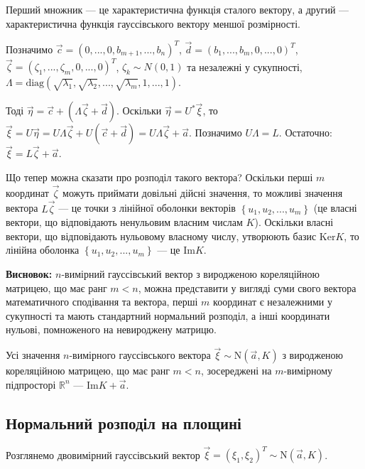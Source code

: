 Перший множник --- це характеристична функція сталого вектору, а другий --- характеристична функція гауссівського вектору меншої розмірності.

Позначимо $\vec{c} = (0, ..., 0, b_{m+1}, ..., b_{n})^T$,
$\vec{d} = (b_1, ..., b_m, 0, ..., 0)^T$,
$\vec{\zeta} = (\zeta_1, ..., \zeta_m, 0, ..., 0)^T$, $\zeta_k \sim {N}(0, 1)$ та незалежні у сукупності,
$\Lambda = \mathrm{diag}(\sqrt{\lambda_1}, \sqrt{\lambda_2}, ..., \sqrt{\lambda_m}, 1, ..., 1)$.

Тоді $\vec{\eta} = \vec{c} + \left(\Lambda \vec{\zeta} + \vec{d} \right)$. 
Оскільки $\vec{\eta} = U^{*}\vec{\xi}$, то $\vec{\xi} = U\vec{\eta} = U\Lambda \vec{\zeta} + U(\vec{c} + \vec{d}) = U\Lambda \vec{\zeta} + \vec{a}$.
Позначимо $U\Lambda = L$. Остаточно: $\vec{\xi} = L\vec{\zeta} + \vec{a}$.

Що тепер можна сказати про розподіл такого вектора? Оскільки перші $m$ координат $\vec{\zeta}$ можуть приймати довільні дійсні значення, то
можливі значення вектора $L\vec{\zeta}$ --- це точки з лінійної оболонки векторів $\left\{u_1, u_2, ..., u_m\right\}$ (це власні вектори, що відповідають ненульовим власним числам $K$).
Оскільки власні вектори, що відповідають нульовому власному числу, утворюють базис $\mathrm{Ker}K$, то лінійна оболонка $\left\{u_1, u_2, ..., u_m\right\}$ --- це $\mathrm{Im}K$.


\textbf{Висновок:} $n$-вимірний гауссівський вектор з виродженою кореляційною матрицею, що має ранг $m<n$, можна представити
у вигляді суми свого вектора математичного сподівання та вектора, перші $m$ координат є незалежними у сукупності та мають стандартний нормальний розподіл, 
а інші координати нульові, помноженого на невироджену матрицю. 

Усі значення $n$-вимірного гауссівського вектора $\vec{\xi} \sim \mathrm{N}(\vec{a}, K)$ з виродженою кореляційною матрицею, що має ранг $m<n$,
зосереджені на $m$-вимірному підпросторі $\mathbb{R}^n$ --- $\mathrm{Im}K + \vec{a}$.
\subsection{Нормальний розподіл на площині} 
Розглянемо двовимірний гауссівський вектор $\vec{\xi} = (\xi_1, \xi_2)^T \sim \mathrm{N}(\vec{a}, K)$.

